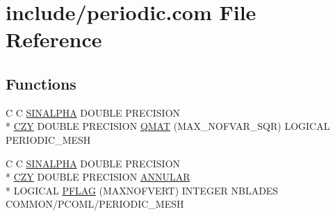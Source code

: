 \hypertarget{periodic_8com}{\section{include/periodic.com File Reference}
\label{periodic_8com}
}
\subsection*{Functions}
\begin{DoxyCompactItemize}
\item 
C C \hyperlink{periodic_8com_a76d1a34bb91d6b27600fc2c1bc9b26fd}{S\-I\-N\-A\-L\-P\-H\-A} D\-O\-U\-B\-L\-E P\-R\-E\-C\-I\-S\-I\-O\-N \\*
\hyperlink{periodic_8com_adb297821c3d32421de02ebdcccf54496}{C\-Z\-Y} D\-O\-U\-B\-L\-E P\-R\-E\-C\-I\-S\-I\-O\-N \hyperlink{periodic_8com_a6c6fc0d4d935035139f984a182d51c81}{Q\-M\-A\-T} (M\-A\-X\-\_\-\-N\-O\-F\-V\-A\-R\-\_\-\-S\-Q\-R) L\-O\-G\-I\-C\-A\-L P\-E\-R\-I\-O\-D\-I\-C\-\_\-\-M\-E\-S\-H
\item 
C C \hyperlink{periodic_8com_a76d1a34bb91d6b27600fc2c1bc9b26fd}{S\-I\-N\-A\-L\-P\-H\-A} D\-O\-U\-B\-L\-E P\-R\-E\-C\-I\-S\-I\-O\-N \\*
\hyperlink{periodic_8com_adb297821c3d32421de02ebdcccf54496}{C\-Z\-Y} D\-O\-U\-B\-L\-E P\-R\-E\-C\-I\-S\-I\-O\-N \hyperlink{periodic_8com_a4d79b405c5ac65e6460b47e6dd1f4ac4}{A\-N\-N\-U\-L\-A\-R} \\*
L\-O\-G\-I\-C\-A\-L \hyperlink{periodic_8com_a52cabf2f682fb4b41d02b41bd40dbea3}{P\-F\-L\-A\-G} (M\-A\-X\-N\-O\-F\-V\-E\-R\-T) I\-N\-T\-E\-G\-E\-R N\-B\-L\-A\-D\-E\-S C\-O\-M\-M\-O\-N/P\-C\-O\-M\-L/P\-E\-R\-I\-O\-D\-I\-C\-\_\-\-M\-E\-S\-H
\end{DoxyCompactItemize}
